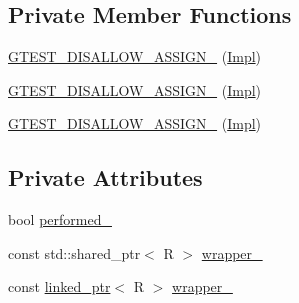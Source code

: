 \subsection*{Private Member Functions}
\begin{DoxyCompactItemize}
\item 
\mbox{\hyperlink{classtesting_1_1internal_1_1_return_action_1_1_impl_3_01_by_move_wrapper_3_01_r___01_4_00_01_f_01_4_a989ee18a52a8bacfac5c9b6bfe82cf53}{G\+T\+E\+S\+T\+\_\+\+D\+I\+S\+A\+L\+L\+O\+W\+\_\+\+A\+S\+S\+I\+G\+N\+\_\+}} (\mbox{\hyperlink{classtesting_1_1internal_1_1_return_action_1_1_impl}{Impl}})
\item 
\mbox{\hyperlink{classtesting_1_1internal_1_1_return_action_1_1_impl_3_01_by_move_wrapper_3_01_r___01_4_00_01_f_01_4_a989ee18a52a8bacfac5c9b6bfe82cf53}{G\+T\+E\+S\+T\+\_\+\+D\+I\+S\+A\+L\+L\+O\+W\+\_\+\+A\+S\+S\+I\+G\+N\+\_\+}} (\mbox{\hyperlink{classtesting_1_1internal_1_1_return_action_1_1_impl}{Impl}})
\item 
\mbox{\hyperlink{classtesting_1_1internal_1_1_return_action_1_1_impl_3_01_by_move_wrapper_3_01_r___01_4_00_01_f_01_4_a989ee18a52a8bacfac5c9b6bfe82cf53}{G\+T\+E\+S\+T\+\_\+\+D\+I\+S\+A\+L\+L\+O\+W\+\_\+\+A\+S\+S\+I\+G\+N\+\_\+}} (\mbox{\hyperlink{classtesting_1_1internal_1_1_return_action_1_1_impl}{Impl}})
\end{DoxyCompactItemize}
\subsection*{Private Attributes}
\begin{DoxyCompactItemize}
\item 
bool \mbox{\hyperlink{classtesting_1_1internal_1_1_return_action_1_1_impl_3_01_by_move_wrapper_3_01_r___01_4_00_01_f_01_4_adb9db786f4a87a4a8a055ddc840f9d77}{performed\+\_\+}}
\item 
const std\+::shared\+\_\+ptr$<$ R $>$ \mbox{\hyperlink{classtesting_1_1internal_1_1_return_action_1_1_impl_3_01_by_move_wrapper_3_01_r___01_4_00_01_f_01_4_af12916ed0cd53b7bb11606506393befa}{wrapper\+\_\+}}
\item 
const \mbox{\hyperlink{classtesting_1_1internal_1_1linked__ptr}{linked\+\_\+ptr}}$<$ R $>$ \mbox{\hyperlink{classtesting_1_1internal_1_1_return_action_1_1_impl_3_01_by_move_wrapper_3_01_r___01_4_00_01_f_01_4_a8ff130e32f8b90238cdbf7d62fe99de1}{wrapper\+\_\+}}
\end{DoxyCompactItemize}


